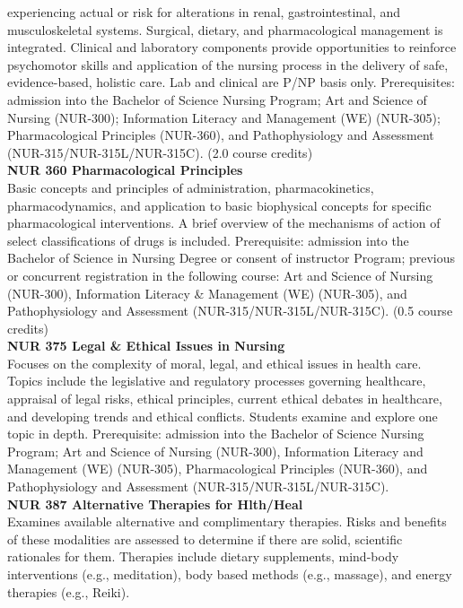 \documentclass[
  letterpaper,
]{scrbook}
\begin{document}
experiencing actual or risk for alterations in renal, gastrointestinal,
and musculoskeletal systems. Surgical, dietary, and pharmacological
management is integrated. Clinical and laboratory components provide
opportunities to reinforce psychomotor skills and application of the
nursing process in the delivery of safe, evidence-based, holistic care.
Lab and clinical are P/NP basis only. Prerequisites: admission into the
Bachelor of Science Nursing Program; Art and Science of Nursing
(NUR-300); Information Literacy and Management (WE) (NUR-305);
Pharmacological Principles (NUR-360), and Pathophysiology and Assessment
(NUR-315/NUR-315L/NUR-315C). (2.0 course credits)\\
\textbf{NUR 360 Pharmacological Principles}\\
Basic concepts and principles of administration, pharmacokinetics,
pharmacodynamics, and application to basic biophysical concepts for
specific pharmacological interventions. A brief overview of the
mechanisms of action of select classifications of drugs is included.
Prerequisite: admission into the Bachelor of Science in Nursing Degree
or consent of instructor Program; previous or concurrent registration in
the following course: Art and Science of Nursing (NUR-300), Information
Literacy \& Management (WE) (NUR-305), and Pathophysiology and
Assessment (NUR-315/NUR-315L/NUR-315C). (0.5 course credits)\\
\textbf{NUR 375 Legal \& Ethical Issues in Nursing}\\
Focuses on the complexity of moral, legal, and ethical issues in health
care. Topics include the legislative and regulatory processes governing
healthcare, appraisal of legal risks, ethical principles, current
ethical debates in healthcare, and developing trends and ethical
conflicts. Students examine and explore one topic in depth.
Prerequisite: admission into the Bachelor of Science Nursing Program;
Art and Science of Nursing (NUR-300), Information Literacy and
Management (WE) (NUR-305), Pharmacological Principles (NUR-360), and
Pathophysiology and Assessment (NUR-315/NUR-315L/NUR-315C).\\
\textbf{NUR 387 Alternative Therapies for Hlth/Heal}\\
Examines available alternative and complimentary therapies. Risks and
benefits of these modalities are assessed to determine if there are
solid, scientific rationales for them. Therapies include dietary
supplements, mind-body interventions (e.g., meditation), body based
methods (e.g., massage), and energy therapies (e.g., Reiki).
\end{document}
